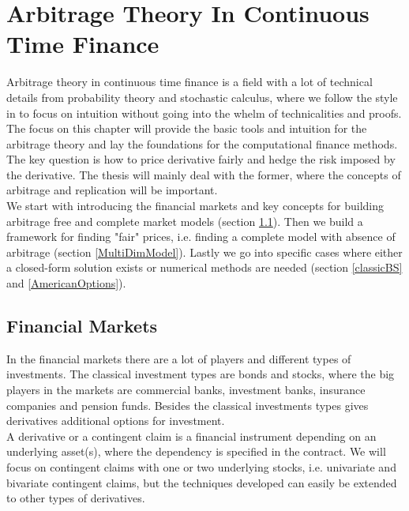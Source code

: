 
\chapter{Arbitrage Theory In Continuous Time Finance} %

\label{Chapter2} %

Arbitrage theory in continuous time finance is a field with a lot of technical details from probability theory and stochastic calculus, where we follow the style in \parencite{Hull, finKont} to focus on intuition without going into the whelm of technicalities and proofs. The focus on this chapter will provide the basic tools and intuition for the arbitrage theory and lay the foundations for the computational finance methods. The key question is how to price derivative fairly and hedge the risk imposed by the derivative. The thesis will mainly deal with the former, where the concepts of arbitrage and replication will be important.\\

We start with introducing the financial markets and key concepts for building arbitrage free and complete market models (section \ref{FinMarket}). Then we build a framework for finding "fair" prices, i.e. finding a complete model with absence of arbitrage (section \ref{MultiDimModel}). Lastly we go into specific cases where either a closed-form solution exists or numerical methods are needed (section \ref{classicBS} and \ref{AmericanOptions}).


\section{Financial Markets}\label{FinMarket}
In the financial markets there are a lot of players and different types of investments. The classical investment types are bonds and stocks, where the big players in the markets are commercial banks, investment banks, insurance companies and pension funds. Besides the classical investments types gives derivatives additional options for investment.\\

A derivative or a contingent claim is a financial instrument depending on an underlying asset(s), where the dependency is specified in the contract. We will focus on contingent claims with one or two underlying stocks, i.e. univariate and bivariate contingent claims, but the techniques developed can easily be extended to other types of derivatives. \\

